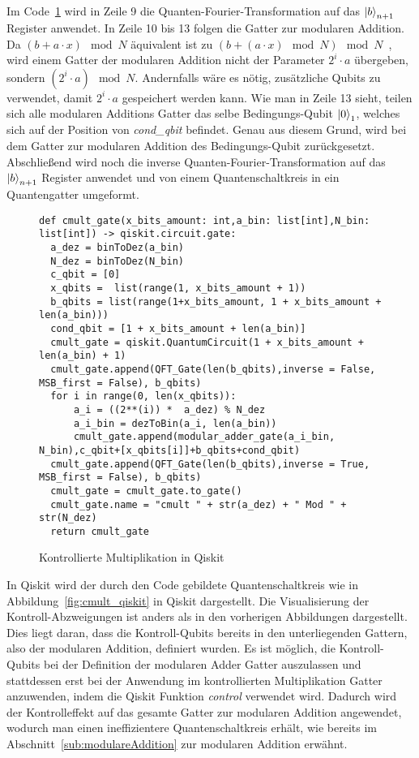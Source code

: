 Im Code~\ref{code:ModularMultiplication} wird in Zeile 9 die Quanten-Fourier-Transformation auf 
das \(\ket{b}_{n+1}\) Register anwendet.
In Zeile 10 bis 13 folgen die Gatter zur modularen Addition.
Da \((b + a \cdot x) \mod N\) äquivalent ist zu \((b + (a \cdot x)\mod N) \mod N\)~\cite{koepf_modular_2021}, 
wird einem Gatter der modularen Addition nicht der Parameter \(2^i\cdot a\) übergeben, 
sondern \((2^i\cdot a)\mod N\).
Andernfalls wäre es nötig, 
zusätzliche Qubits zu verwendet, 
damit \(2^i\cdot a\) gespeichert werden kann.
Wie man in Zeile 13 sieht, teilen sich alle modularen Additions Gatter das selbe Bedingungs-Qubit \(\ket{0}_1\), 
welches sich auf der Position von \textit{cond\_qbit} befindet.
Genau aus diesem Grund, wird bei dem Gatter zur modularen Addition des Bedingungs-Qubit zurückgesetzt.
Abschließend wird noch die inverse Quanten-Fourier-Transformation auf das \(\ket{b}_{n+1}\) Register anwendet und 
von einem Quantenschaltkreis in ein Quantengatter umgeformt.

\begin{figure}[H]
  \caption{Kontrollierte Multiplikation in Qiskit}
  \label{code:ModularMultiplication}
\begin{verbatim}  
def cmult_gate(x_bits_amount: int,a_bin: list[int],N_bin: list[int]) -> qiskit.circuit.gate:  
  a_dez = binToDez(a_bin)
  N_dez = binToDez(N_bin)
  c_qbit = [0]
  x_qbits =  list(range(1, x_bits_amount + 1))
  b_qbits = list(range(1+x_bits_amount, 1 + x_bits_amount + len(a_bin)))
  cond_qbit = [1 + x_bits_amount + len(a_bin)]
  cmult_gate = qiskit.QuantumCircuit(1 + x_bits_amount + len(a_bin) + 1)
  cmult_gate.append(QFT_Gate(len(b_qbits),inverse = False, MSB_first = False), b_qbits)
  for i in range(0, len(x_qbits)):
      a_i = ((2**(i)) *  a_dez) % N_dez
      a_i_bin = dezToBin(a_i, len(a_bin))
      cmult_gate.append(modular_adder_gate(a_i_bin, N_bin),c_qbit+[x_qbits[i]]+b_qbits+cond_qbit)
  cmult_gate.append(QFT_Gate(len(b_qbits),inverse = True, MSB_first = False), b_qbits)
  cmult_gate = cmult_gate.to_gate()
  cmult_gate.name = "cmult " + str(a_dez) + " Mod " + str(N_dez)
  return cmult_gate
  \end{verbatim}
\end{figure}

In Qiskit wird der durch den Code gebildete Quantenschaltkreis wie in Abbildung~\ref{fig:cmult_qiskit} in Qiskit dargestellt.
Die Visualisierung der Kontroll-Abzweigungen ist anders als in den vorherigen Abbildungen dargestellt.
Dies liegt daran, dass die Kontroll-Qubits bereits in den unterliegenden Gattern, 
also der modularen Addition, 
definiert wurden.
Es ist möglich, die Kontroll-Qubits bei der Definition der modularen Adder Gatter auszulassen und 
stattdessen erst bei der Anwendung im kontrollierten Multiplikation Gatter anzuwenden, 
indem die Qiskit Funktion \textit{control} verwendet wird.
Dadurch wird der Kontrolleffekt auf das gesamte Gatter zur modularen Addition angewendet, 
wodurch man einen ineffizientere Quantenschaltkreis erhält, 
wie bereits im Abschnitt~\ref{sub:modulareAddition} zur modularen Addition erwähnt.

